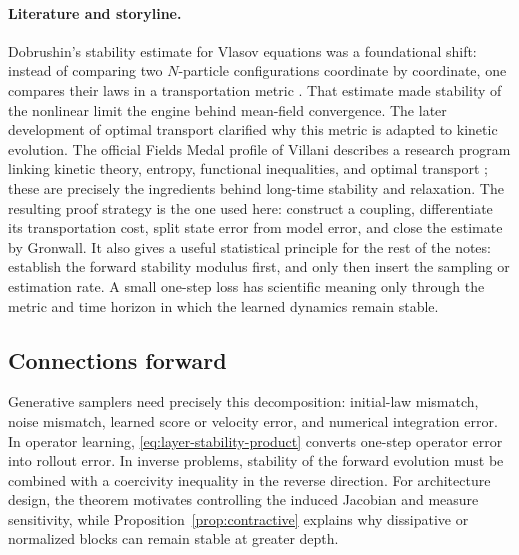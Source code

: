 \documentclass[11pt]{amsart}
\numberwithin{equation}{section}
\theoremstyle{plain}
\begin{document}
\paragraph{\textbf{Literature and storyline.}}
Dobrushin's stability estimate for Vlasov equations was a foundational shift:
instead of comparing two $N$-particle configurations coordinate by coordinate,
one compares their laws in a transportation metric
\cite{Dobrushin1979}.  That estimate made stability of the nonlinear limit the
engine behind mean-field convergence.  The later development of optimal
transport clarified why this metric is adapted to kinetic evolution.  The
official Fields Medal profile of Villani describes a research program linking
kinetic theory, entropy, functional inequalities, and optimal transport
\cite{VillaniFieldsProfile2010}; these are precisely the ingredients behind
long-time stability and relaxation.  The resulting proof strategy is the one
used here: construct a coupling, differentiate its transportation cost, split
state error from model error, and close the estimate by Gronwall.  It also
gives a useful statistical principle for the rest of the notes: establish the
forward stability modulus first, and only then insert the sampling or
estimation rate.  A small one-step loss has scientific meaning only through
the metric and time horizon in which the learned dynamics remain stable.


\subsection{Connections forward}
Generative samplers need precisely this decomposition: initial-law mismatch,
noise mismatch,
learned score or velocity error, and numerical integration error.  In operator
learning, \eqref{eq:layer-stability-product} converts one-step operator error
into rollout error.  In inverse problems, stability of the forward evolution
must be combined with a coercivity inequality in the reverse direction.  For
architecture design, the theorem motivates controlling the induced Jacobian
and measure sensitivity, while Proposition~\ref{prop:contractive} explains why
dissipative or normalized blocks can remain stable at greater depth.




\newpage
\end{document}
